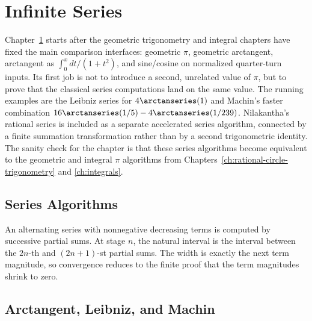\chapter{Infinite Series}
\label{ch:infinite-series}

Chapter~\ref{ch:infinite-series} starts after the geometric trigonometry and
integral chapters have fixed the main comparison interfaces: geometric \(\pi\),
geometric arctangent, arctangent as \(\int_0^x dt/(1+t^2)\), and sine/cosine
on normalized quarter-turn inputs.  Its first job is not to introduce a second,
unrelated value of \(\pi\), but to prove that the classical series
computations land on the same value.  The running examples are the Leibniz
series for \(4\arctanseries(1)\) and Machin's faster combination
\(16\arctanseries(1/5)-4\arctanseries(1/239)\).
Nilakantha's rational series is included as a separate accelerated series
algorithm, connected by a finite summation transformation rather than by a
second trigonometric identity.
The sanity check for the chapter is that these series algorithms become
equivalent to the geometric and integral \(\pi\) algorithms from
Chapters~\ref{ch:rational-circle-trigonometry} and \ref{ch:integrals}.


\section{Series Algorithms}

\begin{definition}
\label{def:alternating-series-intervals}
An alternating series with nonnegative decreasing terms is computed by
successive partial sums.  At stage \(n\), the natural interval is the interval
between the \(2n\)-th and \((2n+1)\)-st partial sums.  The width is exactly
the next term magnitude, so convergence reduces to the finite proof that the
term magnitudes shrink to zero.
\end{definition}

\section{Arctangent, Leibniz, and Machin}

